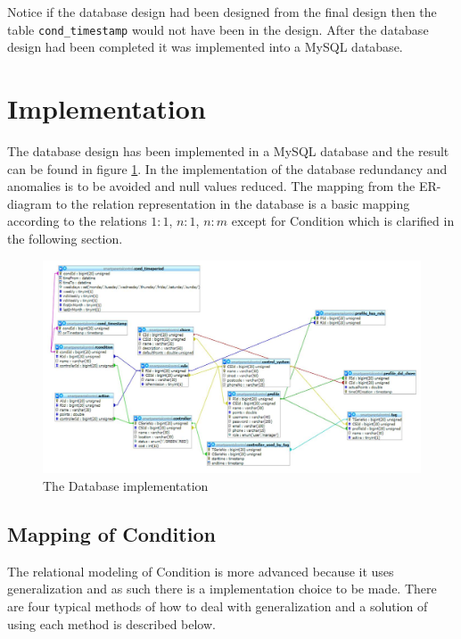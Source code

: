 Notice if the database design had been designed from the final design then the table \texttt{cond\_timestamp} would not have been in the design.
After the database design had been completed it was implemented into a MySQL database.  

\section{Implementation}

The database design has been implemented in a MySQL database and the result can be found in figure \ref{fig:databaseDiagram}. In the implementation of the database redundancy and anomalies is to be avoided and null values reduced. 
The mapping from the ER-diagram to the relation representation in the database is a basic mapping according to the relations $1:1$, $n:1$, $n:m$ except for Condition which is clarified in the following section. \citep{DatabaseKilde}

\begin{figure}
	\centering
		\includegraphics[width=1.50\textwidth,  angle=90]{images/databaseDiagram.jpg}
	\caption{The Database implementation}
	\label{fig:databaseDiagram}
\end{figure}

\subsection{Mapping of Condition}
\label{subsec:mappRule}
The relational modeling of Condition is more advanced because it uses generalization and as such there is a implementation choice to be made. There are four typical methods of how to deal with generalization and a solution of using each method is described below.\citep{DatabaseKilde}

